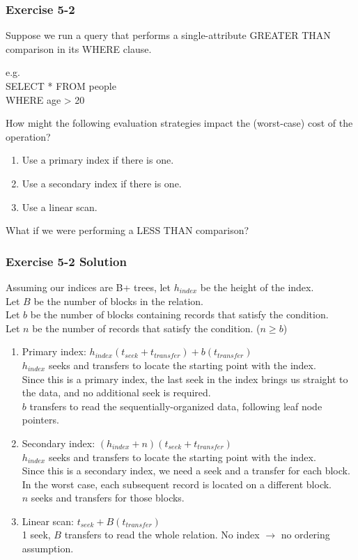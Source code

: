 \begin{frame}
\frametitle{Exercise 5-2}

Suppose we run a query that performs a single-attribute GREATER THAN comparison in its WHERE clause.

e.g. \\
SELECT * FROM people \\
WHERE age > 20

How might the following evaluation strategies impact the (worst-case) cost of the operation?

\begin{enumerate}
  \item Use a primary index if there is one.
  \item Use a secondary index if there is one.
  \item Use a linear scan.
\end{enumerate}

What if we were performing a LESS THAN comparison?

\end{frame}


\begin{frame}
\frametitle{Exercise 5-2 Solution}

Assuming our indices are B+ trees, let $h_{index}$ be the height of the index. \\
Let $B$ be the number of blocks in the relation. \\
Let $b$ be the number of blocks containing records that satisfy the condition. \\
Let $n$ be the number of records that satisfy the condition. ($n \ge b$)

\begin{enumerate}
  \item Primary index: $h_{index}(t_{seek} + t_{transfer}) + b(t_{transfer})$ \\
    $h_{index}$ seeks and transfers to locate the starting point with the index. \\
    Since this is a primary index, the last seek in the index brings us straight to the data, and no additional seek is required. \\
    $b$ transfers to read the sequentially-organized data, following leaf node pointers.
  \item Secondary index: $(h_{index} + n)(t_{seek} + t_{transfer})$ \\
    $h_{index}$ seeks and transfers to locate the starting point with the index. \\
    Since this is a secondary index, we need a seek and a transfer for each block. In the worst case, each subsequent record is located on a different block. \\
    $n$ seeks and transfers for those blocks.
  \item Linear scan: $t_{seek} + B(t_{transfer})$ \\
    1 seek, $B$ transfers to read the whole relation. No index $\rightarrow$ no ordering assumption.
\end{enumerate}

\end{frame}


